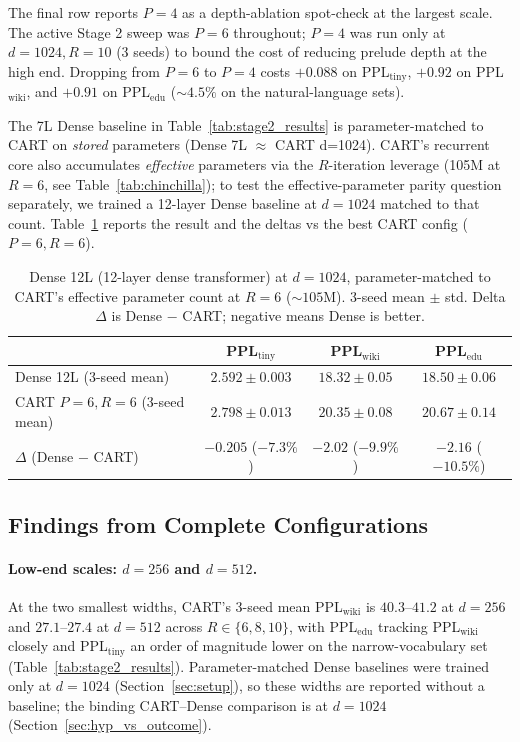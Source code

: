 \documentclass{article}
\newcommand{\cart}{\textsc{CART}}
\newcommand{\pplwiki}{PPL$_\text{wiki}$}
\newcommand{\ppltiny}{PPL$_\text{tiny}$}
\newcommand{\ppledu}{PPL$_\text{edu}$}
\begin{document}
The final row reports $P{=}4$ as a depth-ablation spot-check at the largest scale. The active Stage 2 sweep was $P{=}6$ throughout; $P{=}4$ was run only at $d{=}1024, R{=}10$ (3 seeds) to bound the cost of reducing prelude depth at the high end. Dropping from $P{=}6$ to $P{=}4$ costs $+0.088$ on \ppltiny{}, $+0.92$ on \pplwiki{}, and $+0.91$ on \ppledu{} ($\sim 4.5\%$ on the natural-language sets).

The 7L Dense baseline in Table~\ref{tab:stage2_results} is parameter-matched to CART on \emph{stored} parameters (Dense 7L $\approx$ CART d=1024). CART's recurrent core also accumulates \emph{effective} parameters via the $R$-iteration leverage (105M at $R{=}6$, see Table~\ref{tab:chinchilla}); to test the effective-parameter parity question separately, we trained a 12-layer Dense baseline at $d{=}1024$ matched to that count. Table~\ref{tab:stage2_dense12l} reports the result and the deltas vs the best CART config ($P{=}6, R{=}6$).

\begin{table}[htbp]
\centering
\caption{Dense 12L (12-layer dense transformer) at $d{=}1024$, parameter-matched to CART's effective parameter count at $R{=}6$ ($\sim 105$M). 3-seed mean $\pm$ std. Delta $\Delta$ is Dense $-$ CART; negative means Dense is better.}
\label{tab:stage2_dense12l}
\footnotesize
\begin{tabular}{lccc}
\toprule
 & \ppltiny & \pplwiki & \ppledu \\
\midrule
Dense 12L (3-seed mean)        & $2.592 \pm 0.003$ & $18.32 \pm 0.05$ & $18.50 \pm 0.06$ \\
CART $P{=}6, R{=}6$ (3-seed mean) & $2.798 \pm 0.013$ & $20.35 \pm 0.08$ & $20.67 \pm 0.14$ \\
\midrule
$\Delta$ (Dense $-$ CART)      & $-0.205$ ($-7.3\%$) & $-2.02$ ($-9.9\%$) & $-2.16$ ($-10.5\%$) \\
\bottomrule
\end{tabular}
\end{table}

\subsection{Findings from Complete Configurations}

\paragraph{Low-end scales: $d{=}256$ and $d{=}512$.}
At the two smallest widths, \cart{}'s 3-seed mean \pplwiki{} is $40.3$--$41.2$ at $d{=}256$ and $27.1$--$27.4$ at $d{=}512$ across $R \in \{6, 8, 10\}$, with \ppledu{} tracking \pplwiki{} closely and \ppltiny{} an order of magnitude lower on the narrow-vocabulary set (Table~\ref{tab:stage2_results}). Parameter-matched Dense baselines were trained only at $d{=}1024$ (Section~\ref{sec:setup}), so these widths are reported without a baseline; the binding \cart{}--Dense comparison is at $d{=}1024$ (Section~\ref{sec:hyp_vs_outcome}).
\end{document}
